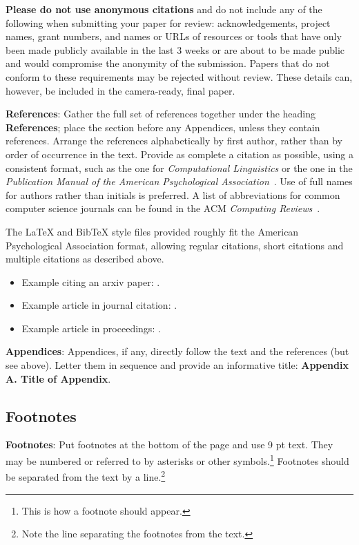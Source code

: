 \documentclass[11pt]{article}
\begin{document}
\textbf{Please do not use anonymous citations} and do not include
any of the following when submitting your paper for review:
acknowledgements, project names, grant numbers, and names or URLs of
resources or tools that have only been made publicly available in
the last 3 weeks or are about to be made public and would compromise the anonymity of the submission.
Papers that do not
conform to these requirements may be rejected without review.
These details can, however, be included in the camera-ready, final paper.

\textbf{References}: Gather the full set of references together under
the heading {\bf References}; place the section before any Appendices,
unless they contain references. Arrange the references alphabetically
by first author, rather than by order of occurrence in the text.
Provide as complete a citation as possible, using a consistent format,
such as the one for {\em Computational Linguistics\/} or the one in the 
{\em Publication Manual of the American 
Psychological Association\/}~\cite{APA:83}.  Use of full names for
authors rather than initials is preferred.  A list of abbreviations
for common computer science journals can be found in the ACM 
{\em Computing Reviews\/}~\cite{ACM:83}.

The \LaTeX{} and Bib\TeX{} style files provided roughly fit the
American Psychological Association format, allowing regular citations, 
short citations and multiple citations as described above.

\begin{itemize}
	\item Example citing an arxiv paper: \cite{rasooli-tetrault-2015}. 
	\item Example article in journal citation: \cite{Aho:72}.
	\item Example article in proceedings: \cite{borsch2011}.
\end{itemize}

{\bf Appendices}: Appendices, if any, directly follow the text and the
references (but see above).  Letter them in sequence and provide an
informative title: {\bf Appendix A. Title of Appendix}.

\subsection{Footnotes}

{\bf Footnotes}: Put footnotes at the bottom of the page and use 9 pt
text. They may be numbered or referred to by asterisks or other
symbols.\footnote{This is how a footnote should appear.} Footnotes
should be separated from the text by a line.\footnote{Note the line
separating the footnotes from the text.}
\end{document}
